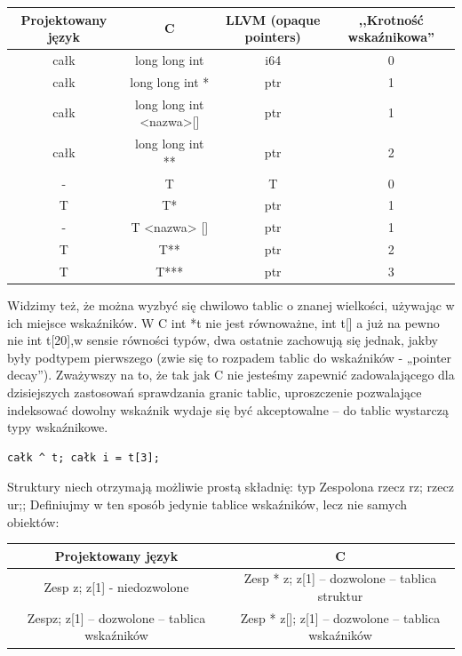 \begin{center}
\begin{tabular}{|c|c|c|c|}
\hline
\textbf{Projektowany język} & \textbf{C} & \textbf{LLVM \tiny{(opaque pointers)}} & \textbf{,,Krotność wskaźnikowa''} \\ \hline
całk        & long long int             & i64 & 0 \\ \hline
całk\up     & long long int *           & ptr & 1 \\ \hline
całk\up     & long long int <nazwa>[]   & ptr & 1 \\ \hline
całk\up\up  & long long int **          & ptr & 2 \\ \hline
-           & T                         & T   & 0 \\ \hline
T           & T*                        & ptr & 1 \\ \hline
-           & T <nazwa> []              & ptr & 1 \\ \hline
T\up        & T**                       & ptr & 2 \\ \hline
T\up\up     & T***                      & ptr & 3 \\ \hline
\end{tabular}
\end{center}

Widzimy też, że można wyzbyć się chwilowo tablic o znanej wielkości, używając w ich miejsce wskaźników. W C int *t  nie jest równoważne, int t[] a już na pewno nie int t[20],w sensie równości typów, dwa ostatnie zachowują się jednak, jakby były podtypem pierwszego (zwie się to rozpadem tablic do wskaźników - „pointer decay”). Zważywszy na to, że tak jak C nie jesteśmy zapewnić zadowalającego dla dzisiejszych zastosowań sprawdzania granic tablic, uproszczenie pozwalające indeksować dowolny wskaźnik wydaje się być akceptowalne – do tablic wystarczą typy wskaźnikowe.
\begin{lstlisting}
całk ^ t; całk i = t[3];
\end{lstlisting}
Struktury niech otrzymają możliwie prostą składnię:
typ Zespolona {rzecz rz; rzecz ur;};
Definiujmy w ten sposób jedynie tablice wskaźników,  lecz nie samych obiektów:
\begin{center}
\begin{tabular}{|c|c|}
\hline
\textbf{Projektowany język} &  \textbf{C} \\ \hline
Zesp z; z[1] - niedozwolone & Zesp * z; z[1] – dozwolone – tablica struktur \\ \hline
Zesp\up \space z; z[1] – dozwolone – tablica wskaźników & Zesp * z[]; z[1] – dozwolone – tablica wskaźników \\ \hline
\end{tabular}
\end{center}

